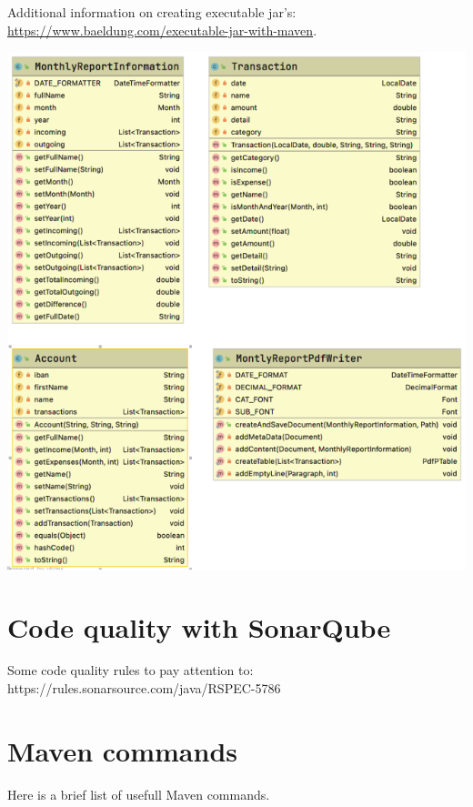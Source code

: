 \begin{oefening}
Additional information on creating executable jar's: \url{https://www.baeldung.com/executable-jar-with-maven}.

\includegraphics[width=\textwidth]{./images/chapter3/exercise-class-diagram} 

\end{oefening}

\section{Code quality with SonarQube}



Some code quality rules to pay attention to:
https://rules.sonarsource.com/java/RSPEC-5786

\section{Maven commands}

Here is a brief list of usefull Maven commands.

